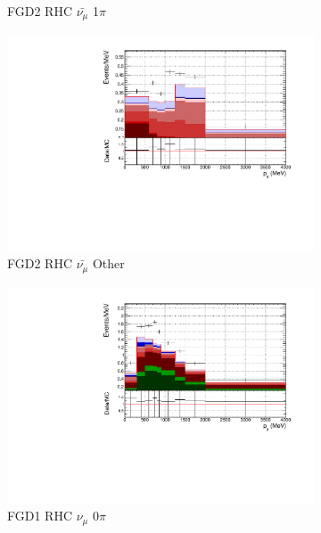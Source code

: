 \begin{figure}
\begin{subfigure}{.32\textwidth}
  \caption{FGD2 RHC $\bar{\nu_{\mu}}$ 1$\pi$}
  \label{fig:pstack_pstack_FGD2_anti-numuCC_1pi}
\end{subfigure}
\begin{subfigure}{.32\textwidth}
  \centering
  \includegraphics[width=0.95\linewidth]{figs/FGD2_anti-numuCC_other_p}
  \caption{FGD2 RHC $\bar{\nu_{\mu}}$ Other}
  \label{fig:pstack_FGD2_anti-numuCC_other}
\end{subfigure}
\begin{subfigure}{.32\textwidth}
  \centering
  \includegraphics[width=0.95\linewidth]{figs/FGD1_NuMuBkg_CC0pi_in_AntiNu_Mode_p}
  \caption{FGD1 RHC $\nu_{\mu}$ 0$\pi$}
  \label{fig:pstack_FGD1_NuMuBkg_CC0pi_in_AntiNu_Mode}
\end{subfigure}
\begin{subfigure}{.32\textwidth}
  \centering

\end{subfigure}
\end{figure}
